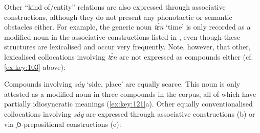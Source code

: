 Other “kind of/entity” relations are also expressed through associative constructions, although they do not present any phonotactic or semantic obstacles either. For example, the generic noun \textit{tɛ́n} ‘time’ is only recorded as a modified noun in the associative constructions listed in , even though these structures are lexicalised and occur very frequently. Note, however, that other, lexicalised collocations involving \textit{tɛ́n} are not expressed as compounds either (cf. \ref{ex:key:103} above):

Compounds involving \textit{sáy} ‘side, place’ are equally scarce. This noun is only attested as a modified noun in three compounds in the corpus, all of which have partially idiosyncratic meanings (\ref{ex:key:121}a). Other equally conventionalised collocations involving \textit{sáy} are expressed through associative constructions (b) or via \textit{fɔ}{}-prepositional constructions (c):

